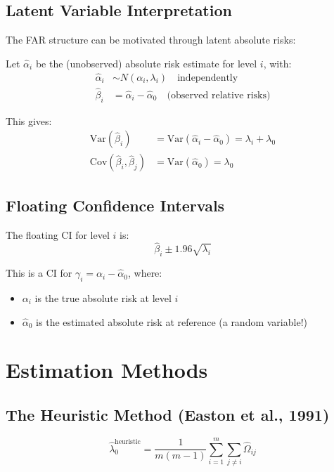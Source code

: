 \documentclass[11pt]{article}
\begin{document}
\subsection{Latent Variable Interpretation}

The FAR structure can be motivated through latent absolute risks:

Let $\hat{\alpha}_i$ be the (unobserved) absolute risk estimate for level $i$, with:
\begin{align}
    \hat{\alpha}_i &\sim N(\alpha_i, \lambda_i) \quad \text{independently} \\
    \hat{\beta}_i &= \hat{\alpha}_i - \hat{\alpha}_0 \quad \text{(observed relative risks)}
\end{align}

This gives:
\begin{align}
    \text{Var}(\hat{\beta}_i) &= \text{Var}(\hat{\alpha}_i - \hat{\alpha}_0) = \lambda_i + \lambda_0 \\
    \text{Cov}(\hat{\beta}_i, \hat{\beta}_j) &= \text{Var}(\hat{\alpha}_0) = \lambda_0
\end{align}

\subsection{Floating Confidence Intervals}

The floating CI for level $i$ is:
\begin{equation}
    \hat{\beta}_i \pm 1.96\sqrt{\lambda_i}
\end{equation}

This is a CI for $\gamma_i = \alpha_i - \hat{\alpha}_0$, where:
\begin{itemize}
    \item $\alpha_i$ is the true absolute risk at level $i$
    \item $\hat{\alpha}_0$ is the estimated absolute risk at reference (a random variable!)
\end{itemize}

\section{Estimation Methods}

\subsection{The Heuristic Method (Easton et al., 1991)}

\begin{equation}
    \hat{\lambda}_0^{\text{heuristic}} = \frac{1}{m(m-1)} \sum_{i=1}^m \sum_{j \neq i} \hat{\Omega}_{ij}
\end{equation}
\end{document}
